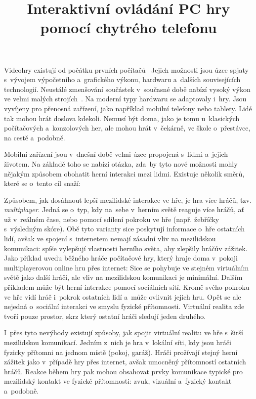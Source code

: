 \documentclass[thesis=B,czech,hidelinks]{FITthesis}[2012/06/26] %
\title{Interaktivn{\' i} ovl{\' a}d{\' a}n{\' i} PC hry pomoc{\' i} chytr{\' e}ho telefonu}
\begin{document}
 

\begin{introduction}
Videohry existují od počátku prvních počítačů~\cite{rylich} Jejich možnosti jsou úzce spjaty s~vývojem výpočetního a~grafického výkonu, hardwaru a~dalších souvisejících technologií. Neustálé zmenšování součástek v~současné době nabízí vysoký výkon ve velmi malých strojích~\cite{kupi}. Na moderní typy hardwaru se adaptovaly i~hry. Jsou vyvíjeny pro přenosná zařízení, jako například mobilní telefony nebo tablety. Lidé tak mohou hrát doslova kdekoli. Nemusí být doma, jako je tomu u~klasických počítačových a~konzolových her, ale mohou hrát v~čekárně, ve škole o~přestávce, na cestě a~podobně.

Mobilní zařízení jsou v~dnešní době velmi úzce propojená s~lidmi a~jejich životem. Na základě toho se nabízí otázka, zda~by tyto nové možnosti mohly nějakým způsobem obohatit herní interakci mezi lidmi. Existuje několik směrů, které se o~tento cíl snaží:

Způsobem, jak dosáhnout lepší mezilidské interakce ve hře, je hra více hráčů, tzv. \textit{multiplayer}. Jedná se o~typ, kdy na~sebe v~herním světě reaguje více hráčů, ať už v~reálném čase, nebo pomocí sdílení pokroku ve hře (např. žebříčky s~výsledným skóre). Obě tyto varianty sice poskytují informace o~hře ostatních lidí, avšak ve spojení s~internetem nemají zásadní vliv na mezilidskou komunikaci: spíše vylepšují vlastnosti herního světa, aby zlepšily hráčův zážitek. Jako příklad uvedu běžného hráče počítačové hry, který hraje doma v~pokoji multiplayerovou online hru přes internet: Sice se pohybuje ve stejném virtuálním světě jako další hráči, ale vliv na mezilidskou komunikaci je minimální. Dalším příkladem může být herní interakce pomocí sociálních sítí. Kromě svého pokroku ve hře vidí hráč i~pokrok ostatních lidí a~může ovlivnit jejich hru. Opět se ale nejedná o~sociální interakci ve smyslu fyzické přítomnosti. Virtuální realita zde tvoří pouze prostor, skrz který ostatní hráči sledují jeden druhého.

I~přes tyto nevýhody existují způsoby, jak spojit virtuální realitu ve hře s~širší mezilidskou komunikací. Jedním z~nich je hra v~lokální síti, kdy jsou hráči fyzicky přítomni na jednom místě (pokoj, garáž). Hráči prožívají stejný herní zážitek jako v~případě hry přes internet, avšak umocněný přítomností ostatních hráčů. Reakce během hry pak mohou obsahovat prvky komunikace typické pro mezilidský kontakt ve fyzické přítomnosti: zvuk, vizuální a~fyzický kontakt a~podobně.


\end{introduction}
\end{document}
